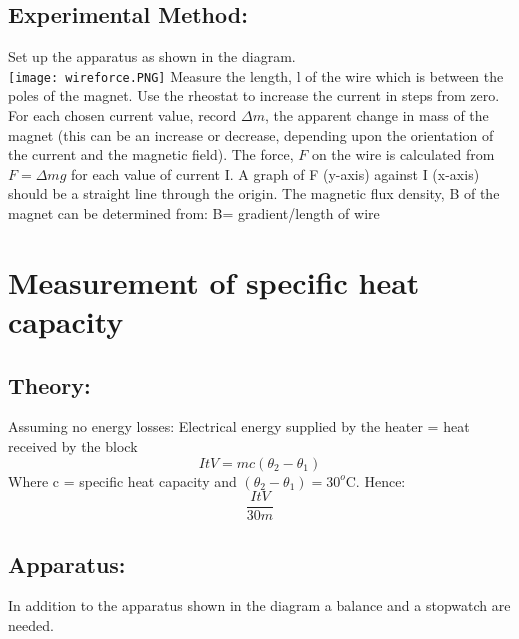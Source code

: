 \subsection{Experimental Method:}
Set up the apparatus as shown in the diagram.\\
\texttt{[image: wireforce.PNG]}
 Measure the length, l of the wire which is between the poles of the magnet. Use the rheostat to increase the current in steps from zero. For each chosen current value, record \(\Delta m\), the apparent change in mass of the magnet (this can be an increase or decrease, depending upon the orientation of the current and the magnetic field). The force, \(F\) on the wire is calculated from \(F = \Delta mg\) for each value of current I. A graph of F (y-axis) against I (x-axis) should be a straight line through the origin. The magnetic flux density, B of the magnet can be determined from: B= gradient/length of wire

\section{Measurement of specific heat capacity}
\subsection{Theory:}
Assuming no energy losses: %
Electrical energy supplied by the heater = heat received by the block
\[ItV = mc(\theta_{2} - \theta_{1})\]
Where c = specific heat capacity and \((\theta_{2} - \theta_{1}) = 30^{o}\text{C}\). Hence:
\[\frac{ItV}{30m}\]
\subsection{Apparatus:}
In addition to the apparatus shown in the diagram a balance and a stopwatch are needed.

